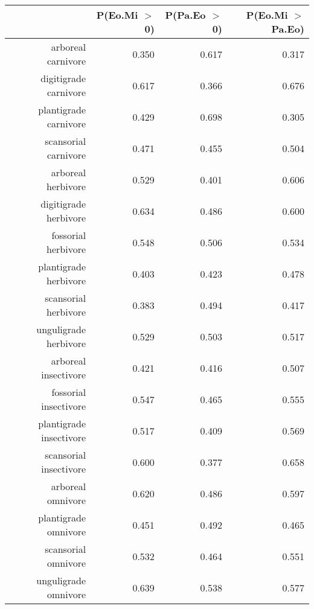 \begin{table}[ht]
\centering
\begin{tabular}{rrrr}
  \hline
 & P(Eo.Mi $>$ 0) & P(Pa.Eo $>$ 0) & P(Eo.Mi $>$ Pa.Eo) \\ 
  \hline
arboreal carnivore & 0.350 & 0.617 & 0.317 \\ 
  digitigrade carnivore & 0.617 & 0.366 & 0.676 \\ 
  plantigrade carnivore & 0.429 & 0.698 & 0.305 \\ 
  scansorial carnivore & 0.471 & 0.455 & 0.504 \\ 
  arboreal herbivore & 0.529 & 0.401 & 0.606 \\ 
  digitigrade herbivore & 0.634 & 0.486 & 0.600 \\ 
  fossorial herbivore & 0.548 & 0.506 & 0.534 \\ 
  plantigrade herbivore & 0.403 & 0.423 & 0.478 \\ 
  scansorial herbivore & 0.383 & 0.494 & 0.417 \\ 
  unguligrade herbivore & 0.529 & 0.503 & 0.517 \\ 
  arboreal insectivore & 0.421 & 0.416 & 0.507 \\ 
  fossorial insectivore & 0.547 & 0.465 & 0.555 \\ 
  plantigrade insectivore & 0.517 & 0.409 & 0.569 \\ 
  scansorial insectivore & 0.600 & 0.377 & 0.658 \\ 
  arboreal omnivore & 0.620 & 0.486 & 0.597 \\ 
  plantigrade omnivore & 0.451 & 0.492 & 0.465 \\ 
  scansorial omnivore & 0.532 & 0.464 & 0.551 \\ 
  unguligrade omnivore & 0.639 & 0.538 & 0.577 \\ 
   \hline
\end{tabular}
\label{tab:surv_plant}
\end{table}
